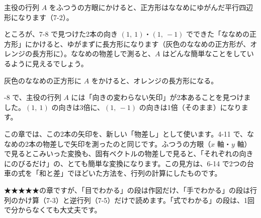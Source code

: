 \begin{hatena}
\noindent\begin{minipage}[c]{0.56\linewidth}
\raggedright
主役の行列 $A$ をふつうの方眼にかけると、正方形はななめにゆがんだ平行四辺形になります（7-2）。\par\vspace{4pt}
ところが、7-8 で見つけた2本の向き $(1,\ 1)$・$(1,\ -1)$ でできた「ななめの正方形」にかけると、ゆがまずに長方形になります（灰色のななめの正方形が、オレンジの長方形に）。ななめの物差しで測ると、$A$ はどんな簡単なことをしているように見えるでしょう。
\end{minipage}\hfill
\begin{minipage}[c]{0.4\linewidth}
\centering
{}\par\vspace{2pt}
{\footnotesize 灰色のななめの正方形に $A$ をかけると、オレンジの長方形になる。}
\end{minipage}
\end{hatena}

-8 で、主役の行列 $A$ には「向きの変わらない矢印」が2本あることを見つけました。$(1,\ 1)$ の向きは3倍に、$(1,\ -1)$ の向きは1倍（そのまま）になります。

この章では、この2本の矢印を、新しい「物差し」として使います。4-11 で、ななめの2本の物差しで矢印を測ったのと同じです。ふつうの方眼（$x$ 軸・$y$ 軸）で見るとこみいった変換も、固有ベクトルの物差しで見ると、「それぞれの向きにのびるだけ」の、とても簡単な変換になります。この見方は、6-14 で2つの台車の式を「和と差」でほどいた方法を、行列の計算にしたものです。

★★★★★の章ですが、「目でわかる」の段は作図だけ、「手でわかる」の段は行列のかけ算（7-3）と逆行列（7-5）だけで読めます。「式でわかる」の段は、1回で分からなくても大丈夫です。

